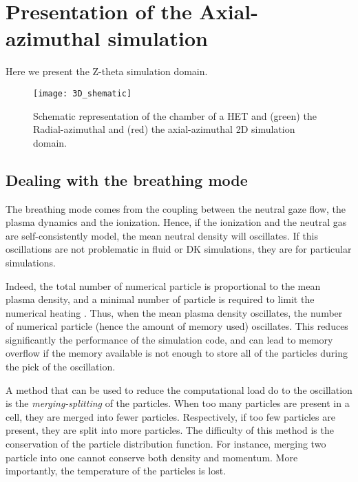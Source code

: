 
\section{Presentation of the Axial-azimuthal simulation}


Here we present the Z-theta simulation domain.


\begin{figure}[hbtp]
  \centering
  \texttt{[image: 3D\_shematic]}
  \caption{Schematic representation of the chamber of a \ac{HET} and (green) the Radial-azimuthal and (red) the axial-azimuthal 2D simulation domain.}
  \label{fig-3Dschematic}
\end{figure}

\subsection{Dealing with the breathing mode} \label{subsec-breathmod}

The breathing mode comes from the coupling between the neutral gaze flow, the plasma dynamics and the ionization.
Hence, if the ionization and the neutral gas are self-consistently model, the mean neutral density will oscillates.
If this oscillations are not problematic in fluid or \ac{DK} simulations, they are for particular simulations.

Indeed, the total number of numerical particle is proportional to the mean plasma density, and a minimal number of particle is required to limit the numerical heating \citep{turner2006}.
Thus, when the mean plasma density oscillates, the number of numerical particle (hence the amount of memory used) oscillates.
This reduces significantly the performance of the simulation code, and can lead to memory overflow if the memory available is not enough to store all of the particles during the pick of the oscillation.

A method that can be used to reduce the computational load do to the oscillation is the \emph{merging-splitting} of the particles.
When too many particles are present in a cell, they are merged into fewer particles.
Respectively, if too few particles are present, they are split into more particles.
The difficulty of this method is the conservation of the particle distribution function.
For instance, merging two particle into one cannot conserve both density and momentum.
More importantly, the temperature of the particles is lost.

